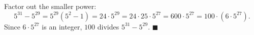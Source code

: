 Factor out the smaller power:
\[
5^{31}-5^{29}=5^{29}\left(5^2-1\right)=24\cdot5^{29}=24\cdot25\cdot5^{27}=600\cdot5^{27}=100\cdot\left(6\cdot5^{27}\right).
\]
Since $6\cdot5^{27}$ is an integer, $100$ divides $5^{31}-5^{29}$. $\blacksquare$
